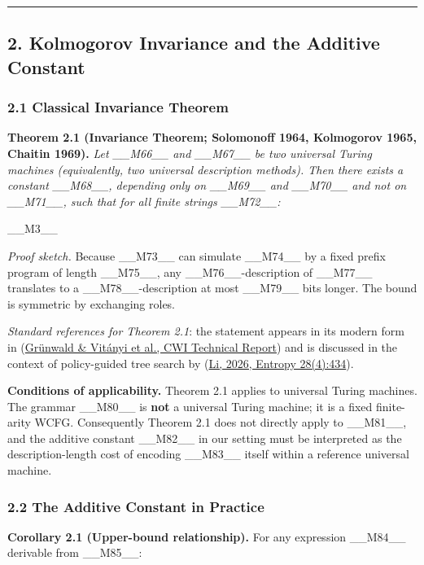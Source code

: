 \noindent\rule{\textwidth}{0.4pt}

\subsection{2. Kolmogorov Invariance and the Additive Constant}

\subsubsection{2.1 Classical Invariance Theorem}

\textbf{Theorem 2.1 (Invariance Theorem; Solomonoff 1964, Kolmogorov 1965, Chaitin 1969).} \textit{Let \_\_M66\_\_ and \_\_M67\_\_ be two universal Turing machines (equivalently, two universal description methods). Then there exists a constant \_\_M68\_\_, depending only on \_\_M69\_\_ and \_\_M70\_\_ and not on \_\_M71\_\_, such that for all finite strings \_\_M72\_\_:}

\_\_M3\_\_

\textit{Proof sketch.} Because \_\_M73\_\_ can simulate \_\_M74\_\_ by a fixed prefix program of length \_\_M75\_\_, any \_\_M76\_\_-description of \_\_M77\_\_ translates to a \_\_M78\_\_-description at most \_\_M79\_\_ bits longer. The bound is symmetric by exchanging roles.

\textit{Standard references for Theorem 2.1}: the statement appears in its modern form in (\href{https://homepages.cwi.nl/~paulv/papers/mdlindbayeskolmcompl.pdf}{Grünwald \& Vitányi et al., CWI Technical Report}) and is discussed in the context of policy-guided tree search by (\href{https://doi.org/10.3390/e28040434}{Li, 2026, Entropy 28(4):434}).

\textbf{Conditions of applicability.} Theorem 2.1 applies to universal Turing machines. The grammar \_\_M80\_\_ is \textbf{not} a universal Turing machine; it is a fixed finite-arity WCFG. Consequently Theorem 2.1 does not directly apply to \_\_M81\_\_, and the additive constant \_\_M82\_\_ in our setting must be interpreted as the description-length cost of encoding \_\_M83\_\_ itself within a reference universal machine.

\subsubsection{2.2 The Additive Constant in Practice}

\textbf{Corollary 2.1 (Upper-bound relationship).} For any expression \_\_M84\_\_ derivable from \_\_M85\_\_:

